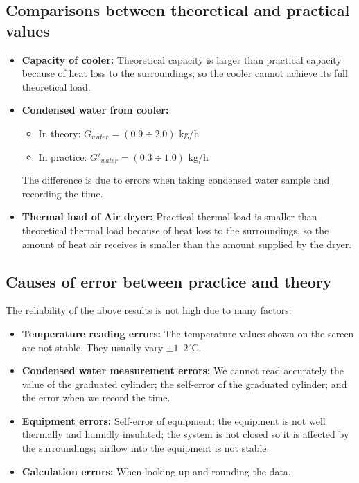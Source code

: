 \subsection{Comparisons between theoretical and practical values}
\begin{itemize}
    \item \textbf{Capacity of cooler:} Theoretical capacity is larger than practical capacity because of heat loss to the surroundings, so the cooler cannot achieve its full theoretical load.
    \item \textbf{Condensed water from cooler:}
    \begin{itemize}
        \item In theory: $G_{water} = (0.9 \div 2.0)$ kg/h
        \item In practice: $G'_{water} = (0.3 \div 1.0)$ kg/h
    \end{itemize}
    The difference is due to errors when taking condensed water sample and recording the time.
    \item \textbf{Thermal load of Air dryer:} Practical thermal load is smaller than theoretical thermal load because of heat loss to the surroundings, so the amount of heat air receives is smaller than the amount supplied by the dryer.
\end{itemize}

\subsection{Causes of error between practice and theory}
The reliability of the above results is not high due to many factors:
\begin{itemize}
    \item \textbf{Temperature reading errors:} The temperature values shown on the screen are not stable. They usually vary $\pm 1$--$2^\circ$C.
    \item \textbf{Condensed water measurement errors:} We cannot read accurately the value of the graduated cylinder; the self-error of the graduated cylinder; and the error when we record the time.
    \item \textbf{Equipment errors:} Self-error of equipment; the equipment is not well thermally and humidly insulated; the system is not closed so it is affected by the surroundings; airflow into the equipment is not stable.
    \item \textbf{Calculation errors:} When looking up and rounding the data.
\end{itemize}
